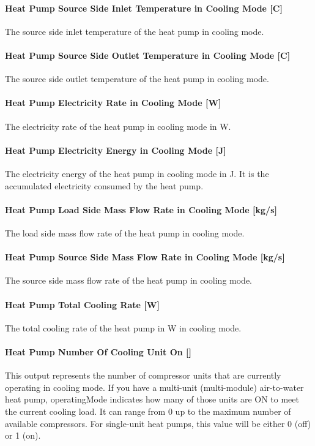 \paragraph{Heat Pump Source Side Inlet Temperature in Cooling Mode {[}C{]}} The
source side inlet temperature of the heat pump in cooling mode.
\paragraph{Heat Pump Source Side Outlet Temperature in Cooling Mode {[}C{]}} The
source side outlet temperature of the heat pump in cooling mode.
\paragraph{Heat Pump Electricity Rate in Cooling Mode {[}W{]}} The electricity
rate of the heat pump in cooling mode in W.
\paragraph{Heat Pump Electricity Energy in Cooling Mode {[}J{]}} The electricity
energy of the heat pump in cooling mode in J. It is the accumulated electricity
consumed by the heat pump.
\paragraph{Heat Pump Load Side Mass Flow Rate in Cooling Mode {[}kg/s{]}} The
load side mass flow rate of the heat pump in cooling mode.
\paragraph{Heat Pump Source Side Mass Flow Rate in Cooling Mode {[}kg/s{]}} The
source side mass flow rate of the heat pump in cooling mode.
\paragraph{Heat Pump Total Cooling Rate {[}W{]}} The total cooling rate of the
heat pump in W in cooling mode.
\paragraph{Heat Pump Number Of Cooling Unit On {[}{]}} 
This output represents the number of compressor units that are currently operating
in cooling mode. If you have a multi-unit (multi-module) air-to-water heat pump,
operatingMode indicates how many of those units are ON to meet the current cooling load.
It can range from 0 up to the maximum number of available compressors. For single-unit heat pumps,
this value will be either 0 (off) or 1 (on).
